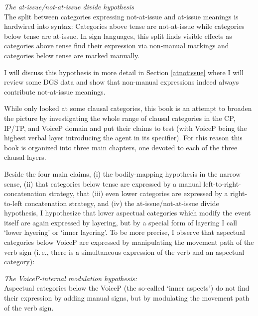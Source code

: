 \begin{exe}
\ex \textit{The at-issue/not-at-issue divide hypothesis} \\
The split between categories expressing not-at-issue and at-issue meanings is hardwired into syntax: Categories above tense are not-at-issue while categories below tense are at-issue.\label{atissuenotatissuedivide} In sign languages, this split finds visible effects as categories above tense find their expression via non-manual markings and categories below tense are marked manually.
\end{exe}

\noindent I will discuss this hypothesis in more detail in Section \ref{atnotissue} where I will review some DGS data and show that non-manual expressions indeed always contribute not-at-issue meanings. 

While \citet{bross2017scope} only looked at some clausal categories, this book is an attempt to broaden the picture by investigating the whole range of clausal categories in the CP, IP/TP, and VoiceP domain and put their claims to test (with VoiceP being the highest verbal layer introducing the agent in its specifier). For this reason this book is organized into three main chapters, one devoted to each of the three clausal layers. 

Beside the four main claims, (i) the bodily-mapping hypothesis in the narrow sense, (ii) that categories below tense are expressed by a manual left-to-right-concatenation strategy, that (iii) even lower categories are expressed by a right-to-left concatenation strategy, and (iv) the at-issue/not-at-issue divide hypothesis, I hypothesize that lower aspectual categories which modify the event itself are again expressed by layering, but by a special form of layering I call `lower layering' or `inner layering'. To be more precise, I observe that aspectual categories below VoiceP are expressed by manipulating the movement path of the verb sign (i.\,e., there is a simultaneous expression of the verb and an aspectual category):

\begin{exe}
\ex \textit{The VoiceP-internal modulation hypothesis:}\\
Aspectual categories below the VoiceP (the so-called `inner aspects') do not find their expression by adding manual signs, but by modulating the movement path of the verb sign. \label{vpinternalmodhyp}
\end{exe}

